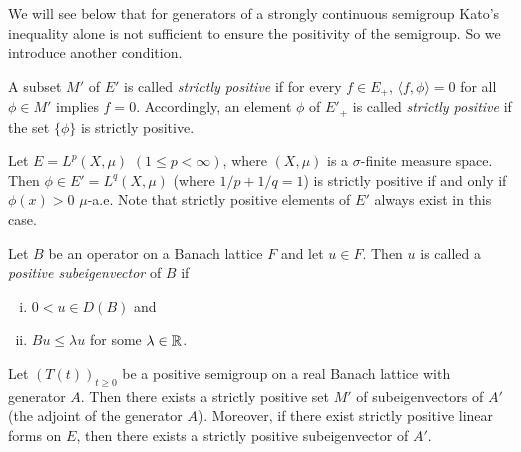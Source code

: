 We will see below that for generators of a strongly continuous semigroup Kato's inequality alone is not sufficient to ensure the positivity of the semigroup.
So we introduce another condition.

\begin{definition}\label{def:c2-3.2}
A subset $M'$ of $E'$ is called \emph{strictly positive} if for every $f \in E_{+}$, $\langle f,\phi \rangle = 0$ for all $\phi \in M'$ implies $f = 0$.
Accordingly, an element $\phi$ of $E'_{+}$ is called \emph{strictly positive} if the set $\{\phi\}$ is strictly positive.
\end{definition}

\begin{example}\label{ex:c2-3.3}
Let $E = L^p(X,\mu)$ $(1 \leq p < \infty)$, where $(X,\mu)$ is a $\sigma$-finite measure space.
Then $\phi \in E'
= L^q(X,\mu)$ (where $1/p + 1/q = 1$) is strictly positive if and only if $\phi(x) > 0$ $\mu$-a.e.
Note that strictly positive elements of $E'$ always exist in this case.
\end{example}

\begin{definition}\label{def:c2-3.4}
Let $B$ be an operator on a Banach lattice $F$ and let $u \in F$.
Then $u$ is called a \emph{positive subeigenvector} of $B$ if
\begin{enumerate}[(i)]
\item \label{def:c2-3.4-1}
$0 < u \in D(B)$ and
\item \label{def:c2-3.4-2}
$Bu \leq \lambda u$ for some $\lambda \in \mathbb{R}$.
\end{enumerate}
\end{definition}

\begin{proposition}\label{prop:c2-3.5}
Let $(T(t))_{t \geq 0}$ be a positive semigroup on a real Banach lattice with generator $A$.
Then there exists a strictly positive set $M'$ of subeigenvectors of $A'$ (the adjoint of the generator $A$).
Moreover, if there exist strictly positive linear forms on $E$, then there exists a strictly positive subeigenvector of $A'$.
\end{proposition}

